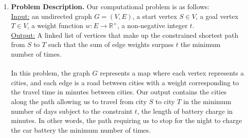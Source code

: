 \documentclass[11pt]{article}
\theoremstyle{nonumberplain}
\begin{document}
\begin{enumerate}
\item \textbf{Problem Description.} %
  Our computational problem is as follows:\\
  \underline{Input:} an undirected graph $G=(V,E)$, a start vertex $S \in V$, a goal vertex $T \in V$, a weight function $w:E \rightarrow \mathbb{R}^+$, a non-negative integer $t$.\\
  \underline{Output:} A linked list of vertices that make up the constrained shortest path from $S$ to $T$ such that the sum of edge weights surpass $t$ the minimum number of times.\\
  \\
  In this problem, the graph $G$ represents a map where each vertex represents a cities, and each edge is a road between cities with a weight corresponding to the travel time in minutes between cities. Our output contains the cities along the path allowing us to travel from city $S$ to city $T$ in the minimum number of days subject to the constraint $t$, the length of battery charge in minutes. In other words, the path requiring us to stop for the night to charge the car battery the minimum number of times.
  

\end{enumerate}
\end{document}
